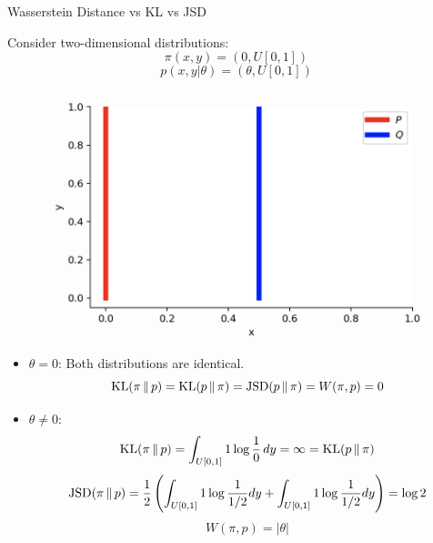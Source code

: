 \documentclass{beamer}
\begin{document}
\begin{frame}{Wasserstein Distance vs KL vs JSD}
	
	\begin{minipage}[t]{0.48\columnwidth}
		\vspace{0.1cm}
		Consider two-dimensional distributions:
		\[
		\pi(x, y) = (0, U[0, 1])
		\]	
		\[
		p(x, y | \theta) = (\theta, U[0, 1])
		\]
	\end{minipage}%
	\begin{minipage}[t]{0.52\columnwidth}
		\begin{figure}
			\centering
			\includegraphics[width=0.8\linewidth]{figs/w_kl_jsd}
		\end{figure}
	\end{minipage}
	\begin{itemize}
		\footnotesize
		\item $\theta = 0$: Both distributions are identical.
		\[
		\mathrm{KL}(\pi\,\|\,p) = \mathrm{KL}(p\,\|\,\pi) = \mathrm{JSD}(p\,\|\,\pi) = W(\pi, p) = 0
		\]
		\item $\theta \neq 0$:
		\[
		\mathrm{KL}(\pi\,\|\,p) = \int_{U[0, 1]} 1 \log \frac{1}{0}\,dy = \infty = \mathrm{KL}(p\,\|\,\pi)
		\]
		\[
		\mathrm{JSD}(\pi\,\|\,p) = \frac{1}{2}\left( \int_{U[0, 1]}1 \log \frac{1}{1/2} dy + \int_{U[0, 1]}1 \log \frac{1}{1/2} dy \right) = \log 2
		\]
		\[
		W(\pi, p) = |\theta|
		\]
	\end{itemize}
	
\end{frame}
\end{document}

